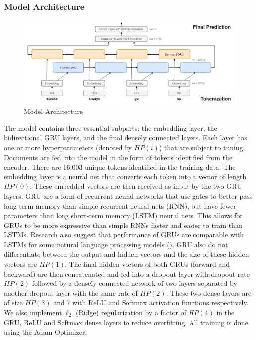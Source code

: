 \documentclass[11pt]{article}
\begin{document}
\subsubsection{Model Architecture}
\begin{figure}[h!]
  \includegraphics[width=\textwidth,height=\textheight,keepaspectratio]{architecture.drawio.png}
    \caption{Model Architecture}
\end{figure}


\noindent The model contains three essential subparts: the embedding layer, the bidirectional GRU layers, and the final densely connected layers. Each layer has one or more hyperparameters (denoted by $HP(i)$) that are subject to tuning. Documents are fed into the model in the form of tokens identified from the encoder. There are 16,003 unique tokens identified in the training data. The embedding layer is a neural net that converts each token into a vector of length $HP(0)$. These embedded vectors are then received as input by the two GRU layers. GRU are a form of recurrent neural networks that use gates to better pass long term memory than simple recurrent neural nets (RNN), but have fewer parameters than long short-term memory (LSTM) neural nets. This allows for GRUs to be more expressive than simple RNNs faster and easier to train than LSTMs. Research also suggest that performance of GRUs are comparable with LSTMs for some natural language processing models (\cite{GRU}). GRU also do not differentiate between the output and hidden vectors and the size of these hidden vectors are $HP(1)$. The final hidden vectors of both GRUs (forward and backward) are then concatenated and fed into a dropout layer with dropout rate $HP(2)$ followed by a densely connected network of two layers separated by another dropout layer with the same rate of $HP(2)$. These two dense layers are of size $HP(3)$ and 7 with ReLU and Softmax activation functions respectively. We also implement $\ell_2$ (Ridge) regularization by a factor of $HP(4)$ in the GRU, ReLU and Softmax dense layers to reduce overfitting. All training is done using the Adam Optimizer.
\end{document}
